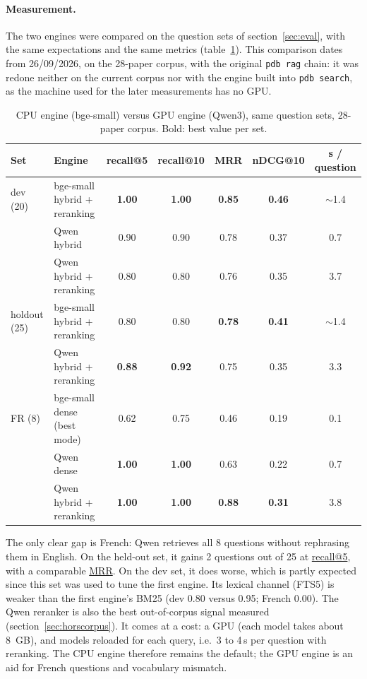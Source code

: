 \documentclass[11pt,a4paper]{article}
\newcommand{\cmd}[1]{\texttt{#1}}
\newcommand{\gl}[2]{\hyperlink{gl:#1}{\textcolor{glcolor}{#2}}}
\begin{document}
\paragraph{Measurement.} The two engines were compared on the question sets of
section~\ref{sec:eval}, with the same expectations and the same metrics
(table~\ref{tab:qwen}). This comparison dates from 26/09/2026, on the 28-paper corpus, with
the original \cmd{pdb rag} chain: it was redone neither on the current corpus nor with the
engine built into \cmd{pdb search}, as the machine used for the later measurements has no GPU.

\begin{table}[ht]
\centering
\caption{CPU engine (bge-small) versus GPU engine (Qwen3), same question sets, 28-paper
corpus. Bold: best value per set.}
\label{tab:qwen}
\small
\begin{tabular}{@{}llccccc@{}}
\toprule
Set & Engine & recall@5 & recall@10 & MRR & nDCG@10 & s / question \\
\midrule
dev (20)     & bge-small hybrid + reranking & \textbf{1.00} & \textbf{1.00} & \textbf{0.85} & \textbf{0.46} & $\sim$1.4 \\
             & Qwen hybrid                  & 0.90 & 0.90 & 0.78 & 0.37 & 0.7 \\
             & Qwen hybrid + reranking      & 0.80 & 0.80 & 0.76 & 0.35 & 3.7 \\
\midrule
holdout (25) & bge-small hybrid + reranking & 0.80 & 0.80 & \textbf{0.78} & \textbf{0.41} & $\sim$1.4 \\
             & Qwen hybrid + reranking      & \textbf{0.88} & \textbf{0.92} & 0.75 & 0.35 & 3.3 \\
\midrule
FR (8)       & bge-small dense (best mode)  & 0.62 & 0.75 & 0.46 & 0.19 & 0.1 \\
             & Qwen dense                   & \textbf{1.00} & \textbf{1.00} & 0.63 & 0.22 & 0.7 \\
             & Qwen hybrid + reranking      & \textbf{1.00} & \textbf{1.00} & \textbf{0.88} & \textbf{0.31} & 3.8 \\
\bottomrule
\end{tabular}
\end{table}

The only clear gap is French: Qwen retrieves all 8 questions without rephrasing them in
English. On the held-out set, it gains 2 questions out of 25 at \gl{recall}{recall@5}, with a comparable
\gl{MRR}{MRR}. On the dev set, it does worse, which is partly expected since this set was used to tune
the first engine. Its lexical channel (FTS5) is weaker than the first engine's BM25 (dev
0.80 versus 0.95; French 0.00). The Qwen reranker is also the best out-of-corpus signal
measured (section~\ref{sec:horscorpus}). It comes at a cost: a GPU (each model takes about
8~GB), and models reloaded for each query, i.e.\ 3 to 4\,s per question with reranking. The
CPU engine therefore remains the default; the GPU engine is an aid for French questions and
vocabulary mismatch.
\end{document}
